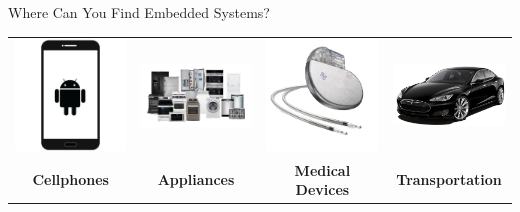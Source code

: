 \documentclass[aspectratio=169]{beamer}
\begin{document}
	
	\begin{frame}{Where Can You Find Embedded Systems?}
	\centering
		\begin{tabular}{c c c c}		
			\includegraphics[width=8em]{img/phone-icon-android-phone.png} &
			\includegraphics[width=8em]{img/appliances.png} &
			\includegraphics[width=8em]{img/Permanent-Pacemaker.png} &
			\includegraphics[width=8em]{img/must_diagonaal1.png} \\
			\tiny{\textbf{Cellphones}} &
			\tiny{\textbf{Appliances}} &
			\tiny{\textbf{Medical Devices}} &
			\tiny{\textbf{Transportation}}
		\end{tabular}
	\end{frame}
	
\end{document}
